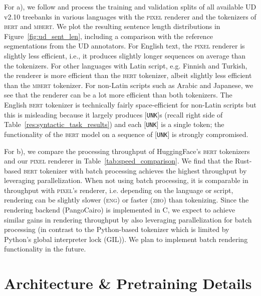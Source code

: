 \documentclass{article}
\newcommand{\model}{\textsc{pixel}\xspace}
\begin{document}
For a), we follow \cite{rust-etal-2021-good} and process the training and validation splits of all available UD v2.10 treebanks in various languages with the \model renderer and the tokenizers of \textsc{bert} and \textsc{mbert}. We plot the resulting sentence length distributions in Figure~\ref{fig:ud_sent_len}, including a comparison with the reference segmentations from the UD annotators. For English text, the \model renderer is slightly less efficient, i.e., it produces slightly longer sequences on average than the tokenizers. For other languages with Latin script, e.g. Finnish and Turkish, the renderer is more efficient than the \textsc{bert} tokenizer, albeit slightly less efficient than the \textsc{mbert} tokenizer. For non-Latin scripts such as Arabic and Japanese, we see that the renderer can be a lot more efficient than both tokenizers. The English \textsc{bert} tokenizer is technically fairly space-efficient for non-Latin scripts but this is misleading because it largely produces {\footnotesize{[\texttt{UNK}]}}s (recall right side of Table~\ref{res:syntactic_task_results}) and each {\footnotesize{[\texttt{UNK}]}} is a single token; the functionality of the \textsc{bert} model on a sequence of {\footnotesize{[\texttt{UNK}]}} is strongly compromised.

For b), we compare the processing throughput of HuggingFace's \textsc{bert} tokenizers and our \model renderer in Table~\ref{tab:speed_comparison}. We find that the Rust-based \textsc{bert} tokenizer with batch processing achieves the highest throughput by leveraging parallelization. When not using batch processing, it is comparable in throughput with \model's renderer, i.e. depending on the language or script, rendering can be slightly slower (\textsc{eng}) or faster (\textsc{zho}) than tokenizing. Since the rendering backend (PangoCairo) is implemented in C, we expect to achieve similar gains in rendering throughput by also leveraging parallelization for batch processing (in contrast to the Python-based tokenizer which is limited by Python's global interpreter lock (GIL)). We plan to implement batch rendering functionality in the future.


\section{Architecture \& Pretraining Details}
\label{app:architecture_details}
\end{document}
